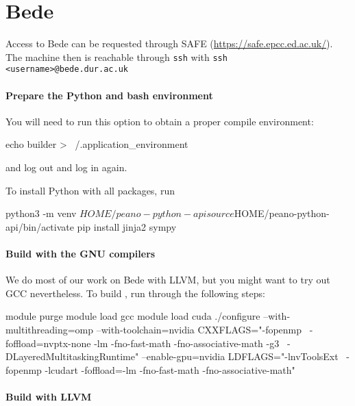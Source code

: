 


\section{Bede}


Access to Bede can be requested through SAFE
(\url{https://safe.epcc.ed.ac.uk/}).
The machine then is reachable through \texttt{ssh} with \texttt{ssh
<username>@bede.dur.ac.uk}


\paragraph{Prepare the Python and bash environment}

You will need to run this option to obtain a proper compile environment:
\begin{code}
echo builder > ~/.application_environment
\end{code}
and log out and log in again.


To install Python with all packages, run
\begin{code}
python3 -m venv $HOME/peano-python-api
source $HOME/peano-python-api/bin/activate
pip install jinja2 sympy
\end{code}


\paragraph{Build with the GNU compilers}


We do most of our work on Bede with LLVM, but you might want to try out GCC
nevertheless.
To build \Peano, run through the following steps:


\begin{code}
module purge
module load gcc
module load cuda
./configure --with-multithreading=omp --with-toolchain=nvidia CXXFLAGS="-fopenmp \ 
  -foffload=nvptx-none -lm -fno-fast-math -fno-associative-math -g3 \
  -DLayeredMultitaskingRuntime" --enable-gpu=nvidia  LDFLAGS="-lnvToolsExt \
  -fopenmp -lcudart -foffload=-lm -fno-fast-math -fno-associative-math"
\end{code}




\paragraph{Build with LLVM}

